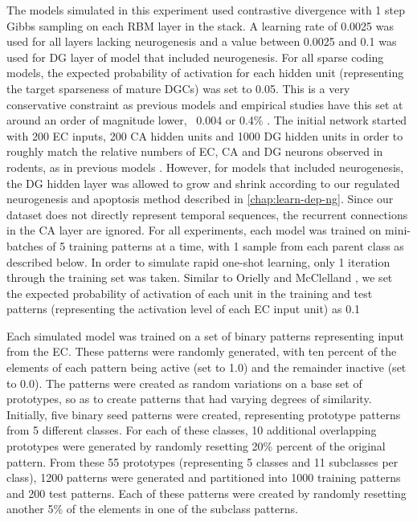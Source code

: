 The models simulated in this experiment used contrastive divergence with 1 step Gibbs sampling 
on each \ac{RBM} layer in the stack. 
A learning rate of 0.0025 was used for all layers lacking neurogenesis and a value 
between 0.0025 and 0.1 was used for \ac{DG} layer of model that included neurogenesis. 
For all sparse coding models, the expected probability of 
activation for each hidden unit (representing the target sparseness of mature \acp{DGC}) was set to 0.05. 
This is a very conservative constraint as previous models and empirical studies have this set 
at around an order of magnitude lower, ~0.004 or 0.4\% \citep{barnes-et-al-90,jung-mcnaughton-93}. 
The initial network started with 200 \ac{EC} inputs, 200 CA hidden units and 1000 \ac{DG} 
hidden units in order to roughly match the relative numbers of \ac{EC}, CA and \ac{DG} neurons 
observed in rodents, as in previous models \citep{oreilly_hippocampal_encoding_storage_and_recall}.
However, for models that included neurogenesis, the \ac{DG} hidden layer was allowed to grow and shrink according 
to our regulated neurogenesis and apoptosis method described in \cref{chap:learn-dep-ng}.
Since our dataset does not directly represent temporal sequences, the 
recurrent connections in the CA layer are ignored. 
For all experiments, each model was trained on mini-batches of 5 training patterns at a time, 
with 1 sample from each parent class as described below. 
In order to simulate rapid one-shot learning, only 1
iteration through the training set was taken.
Similar to Orielly and McClelland \citeyearpar{oreilly_hippocampal_encoding_storage_and_recall}, we set the
expected probability of activation of each unit in the training and test patterns (representing the activation
level of each \ac{EC} input unit) as 0.1

Each simulated model was trained on a set of binary patterns 
representing input from the \ac{EC}. 
These patterns were randomly generated, with ten percent  
of the elements of each pattern being active (set to 1.0) and the remainder
inactive (set to 0.0).  
The patterns were created as random variations on a base
set of prototypes, so as to create patterns that had varying degrees of
similarity. Initially, five binary seed patterns were created, representing
prototype patterns from 5 different classes.
For each of these classes, 10 additional overlapping prototypes were generated
by randomly resetting 20\% percent of the  
original pattern. 
From these 55 prototypes (representing 5 classes and 11 subclasses per class), 
1200 patterns were generated and partitioned into 1000 training patterns and 200 test patterns.
Each of these patterns were created by 
randomly resetting another 5\% of the elements in one of the 
subclass patterns.


